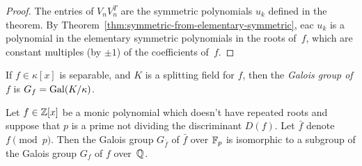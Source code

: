 \begin{proof}
    The entries of $V_nV_n^T$ are the symmetric polynomials $u_k$ defined in the theorem. By Theorem~\ref{thm:symmetric-from-elementary-symmetric}, eac $u_k$ is a polynomial in the elementary symmetric polynomials in the roots of~$f$, which are constant multiples (by $\pm1$) of the coefficients of~$f$.
\end{proof}

\begin{ntn}
    If $f\in\kappa[x]$ is separable, and $K$ is a splitting field for $f$, then the \textsl{Galois group of $f$} is $G_f=\operatorname{Gal}(K/\kappa)$. 
\end{ntn}

\begin{thm}\label{thm:galois-mod-p}
     Let\/ $f\in\mathbb{Z}[x]$ be a monic polynomial which doesn't have repeated roots and suppose that\/ $p$ is a prime not dividing the discriminant\/ $D(f)$. Let\/ $\bar f$ denote\/ $f\pmod p$. Then the Galois group\/ $G_{\bar f}$ of\/ $\bar f$ over\/ $\mathbb F_p$ is isomorphic to a subgroup of the Galois group\/ $G_f$ of\/ $f$ over\/~$\mathbb{Q}$.
\end{thm}

